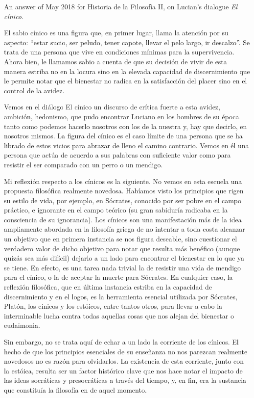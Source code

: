 An answer of May 2018 for Historia de la
Filosofía II, on Lucian's dialogue
\emph{El cínico}.

El sabio cínico es una figura que, en primer
lugar, llama la atención por su aspecto:
``estar sucio, ser peludo, tener capote,
llevar el pelo largo, ir descalzo''. Se trata
de una persona que vive en condiciones
mínimas para la supervivencia. Ahora bien, le
llamamos sabio a cuenta de que su decisión de
vivir de esta manera estriba no en la locura
sino en la elevada capacidad de
discernimiento que le permite notar que el
bienestar no radica en la satisfacción del
placer sino en el control de la avidez.

Vemos en el diálogo El cínico un discurso de
crítica fuerte a esta avidez, ambición,
hedonismo, que pudo encontrar Luciano en los
hombres de su época tanto como podemos
hacerlo nosotros con los de la nuestra y, hay
que decirlo, en nosotros mismos. La figura
del cínico es el caso límite de una persona
que se ha librado de estos vicios para
abrazar de lleno el camino contrario. Vemos
en él una persona que actúa de acuerdo a sus
palabras con suficiente valor como para
resistir el ser comparado con un perro o un
mendigo.

Mi reflexión respecto a los cínicos es la
siguiente. No vemos en esta escuela una
propuesta filosófica realmente novedosa.
Habíamos visto los principios que rigen su
estilo de vida, por ejemplo, en Sócrates,
conocido por ser pobre en el campo práctico,
e ignorante en el campo teórico (su gran
sabiduría radicaba en la consciencia de su
ignorancia). Los cínicos son una
manifestación más de la idea ampliamente
abordada en la filosofía griega de no
intentar a toda costa alcanzar un objetivo
que en primera instancia se nos figura
deseable, sino cuestionar el verdadero valor
de dicho objetivo para notar que resulta más
benéfico (aunque quizás sea más difícil)
dejarlo a un lado para encontrar el bienestar
en lo que ya se tiene. En efecto, es una
tarea nada trivial la de resistir una vida de
mendigo para el cínico, o la de aceptar la
muerte para Sócrates. En cualquier caso, la
reflexión filosófica, que en última instancia
estriba en la capacidad de discernimiento y
en el logos, es la herramienta esencial
utilizada por Sócrates, Platón, los cínicos y
los estóicos, entre tantos otros, para llevar
a cabo la interminable lucha contra todas
aquellas cosas que nos alejan del bienestar o
eudaimonia.

Sin embargo, no se trata aquí de echar a un
lado la corriente de los cínicos. El hecho de
que los principios esenciales de su enseñanza
no nos parezcan realmente novedosos no es
razón para olvidarlos. La existencia de esta
corriente, junto con la estóica, resulta ser
un factor histórico clave que nos hace notar
el impacto de las ideas socráticas y
presocráticas a través del tiempo, y, en fin,
era la sustancia que constituía la filosofía
en de aquel momento.

